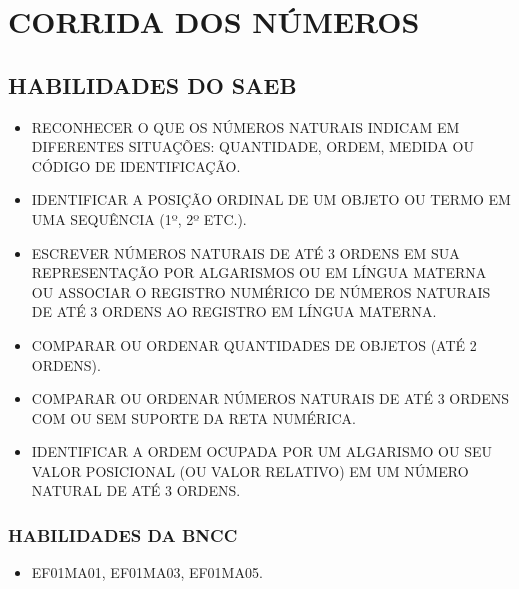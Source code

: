 
\chapter{CORRIDA DOS NÚMEROS}


\section*{HABILIDADES DO SAEB}

\begin{itemize}
\item
  \uppercase{Reconhecer o que os números naturais indicam em diferentes situações:
  quantidade, ordem, medida ou código de identificação.}
\item
  \uppercase{Identificar a posição ordinal de um objeto ou termo em uma sequência
  (1º, 2º etc.).}
\item
  \uppercase{Escrever números naturais de até 3 ordens em sua representação por
  algarismos ou em língua materna ou associar o registro numérico de
  números naturais de até 3 ordens ao registro em língua materna.}
\item
  \uppercase{Comparar ou ordenar quantidades de objetos (até 2 ordens).}
\item
  \uppercase{Comparar ou ordenar números naturais de até 3 ordens com ou sem
  suporte da reta numérica.}
\item
  \uppercase{Identificar a ordem ocupada por um algarismo ou seu valor posicional
  (ou valor relativo) em um número natural de até 3 ordens.}
\end{itemize}

\subsection{HABILIDADES DA BNCC}

\begin{itemize}
  \item EF01MA01, EF01MA03, EF01MA05.
\end{itemize}

